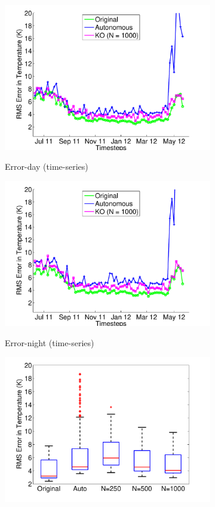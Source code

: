 \documentclass[letterpaper,12pt,peerreviewca,draftcls]{IEEEtran}
\begin{document}
\begin{figure}
	\begin{subfigure}[t]{0.41\textwidth}
		\includegraphics[width=\linewidth]{"Figure 13c"}
		\label{fig:time_series_day}
		\caption{Error-day (time-series)}
	\end{subfigure}
	\begin{subfigure}[t]{0.42\textwidth}
		\includegraphics[width=\linewidth]{"Figure 13d"}
		\label{fig:time_series_night}
	 	\caption{Error-night (time-series)}
	\end{subfigure}
	 \begin{subfigure}[t]{0.41\textwidth}
		\includegraphics[width=\linewidth]{"Figure 13e"}

\end{subfigure}
\end{figure}
\end{document}

